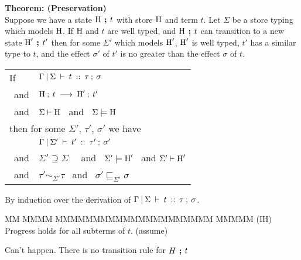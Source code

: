 \clearpage{}
\begin{flushleft}
\textbf{Theorem: (Preservation)} \\
Suppose we have a state $\textrm{H} \hspace{4pt} \textbf{;} \hspace{4pt} t$ with store $\textrm{H}$ and term $t$.
	Let $\Sigma$ be a store typing which models $\textrm{H}$. 
	If $\textrm{H}$ and $t$ are well typed, 
		and $\textrm{H} \hspace{4pt} \textbf{;} \hspace{4pt} t$ can transition to a new state $\textrm{H}' \hspace{4pt} \textbf{;} \hspace{4pt} t'$
		then for some $\Sigma'$ which models $\textrm{H}'$, 
		$\textrm{H}'$ is well typed, 
		$t'$ has a similar type to $t$,
		and the effect $\sigma'$ of $t'$ is no greater than the effect $\sigma$ 
		of $t$.

\medskip
\begin{tabular}{ll}
	If	& $\Gamma \: \arrowvert \: \Sigma \: \vdash \: t \: :: \: \tau \: ; \: \sigma$ \\
	\ and	& $\textrm{H} \: ; \: t \: \longrightarrow \: \textrm{H}' \: ; \: t'$ \\
	\ and	& $\Sigma \vdash \textrm{H}$ \ and \ $\Sigma \models \textrm{H}$ 
	\\[1ex]
	\multicolumn{2}{l}{then for some $\Sigma'$, $\tau'$, $\sigma'$ we have} \\
		& $\Gamma \: \arrowvert \: \Sigma' \: \vdash \: t' \: :: \: \tau' \: ; \: \sigma'$ \\
	\ and	& $\Sigma' \supseteq \Sigma$ \ \ and \ $\Sigma' \models \textrm{H}'$ \ and $\Sigma' \vdash  \textrm{H}'$  \\
	\ and	& $\tau' \sim_{\Sigma'} \tau$ \  and \ $\sigma' \sqsubseteq_{\Sigma'} \sigma$ 
\end{tabular}

\bigskip
{} By induction over the derivation of $\Gamma \: \arrowvert \: \Sigma \: \vdash \: t \: :: \: \tau \: ; \: \sigma$.
\begin{tabbing}
MM \= MMMM \= MMMMMMMMMMMMMMMMMMMMM \= MMMMM  \kill
\>	(IH) 
	\> Progress holds for all subterms of $t$.
	\> (assume)
\end{tabbing}

\bigskip
\bigskip

Can't happen. There is no transition rule for $H \hspace{4pt} \textbf{;} \hspace{4pt} t$



\end{flushleft}
